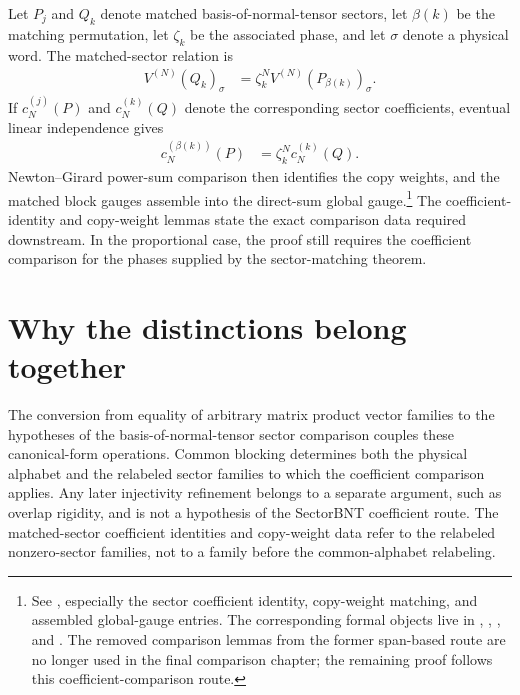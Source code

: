 \documentclass{article}
\begin{document}
Let $P_j$ and $Q_k$ denote matched basis-of-normal-tensor sectors, let
$\beta(k)$ be the matching permutation, let $\zeta_k$ be the associated phase,
and let $\sigma$ denote a physical word. The matched-sector relation is
\begin{align}
    V^{(N)}(Q_k)_{\sigma}
        &=
        \zeta_k^{N}
        V^{(N)}\left(P_{\beta(k)}\right)_{\sigma}.
    \label{eq:rmp_common_blocking_span_equality_sector_phase_relation}
\end{align}
If $c_N^{(j)}(P)$ and $c_N^{(k)}(Q)$ denote the corresponding sector
coefficients, eventual linear independence gives
\begin{align}
    c_N^{(\beta(k))}(P)
        &=
        \zeta_k^{N}c_N^{(k)}(Q).
    \label{eq:rmp_common_blocking_span_equality_sector_coefficient_identity}
\end{align}
Newton--Girard power-sum comparison then identifies the copy weights, and the
matched block gauges assemble into the direct-sum global gauge.\footnote{See
,
especially the sector coefficient identity, copy-weight matching, and assembled
global-gauge entries. The corresponding formal objects live in
,
,
, and
. The
removed comparison lemmas from the former span-based route are no longer used
in the final comparison chapter; the remaining proof follows this
coefficient-comparison route.}
The coefficient-identity and copy-weight lemmas state the exact comparison data
required downstream. In the proportional case, the proof still requires the
coefficient comparison for the phases supplied by the sector-matching theorem.

\section{Why the distinctions belong together}

The conversion from equality of arbitrary matrix product vector families to the
hypotheses of the basis-of-normal-tensor sector comparison couples these
canonical-form operations. Common blocking determines both the physical
alphabet and the relabeled sector families to which the coefficient comparison
applies. Any later injectivity refinement belongs to a separate argument, such
as overlap rigidity, and is not a hypothesis of the SectorBNT coefficient
route. The matched-sector coefficient identities and copy-weight data refer to
the relabeled nonzero-sector families, not to a family before the
common-alphabet relabeling.
\end{document}
